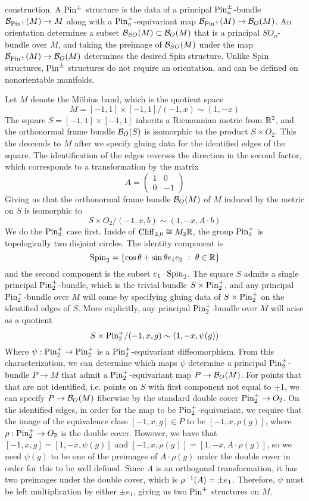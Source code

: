 construction. A $\mathrm{Pin}^\pm$ structure is the data of a principal
$\mathrm{Pin}^\pm_n$-bundle $\mathcal{B}_{\mathrm{Pin}^\pm}(M) \to M$ along with a
$\mathrm{Pin}^\pm_n$-equivariant map $\mathcal{B}_{\mathrm{Pin}^\pm}(M) \to \mathcal{B}_O(M)$. An orientation
determines a subset $\mathcal{B}_{SO}(M) \subset \mathcal{B}_O(M)$ that is a principal
$SO_n$-bundle over $M$, and taking the preimage of $\mathcal{B}_{SO}(M)$ under the
map $\mathcal{B}_{\mathrm{Pin}^\pm}(M) \to \mathcal{B}_O(M)$ determines the desired Spin structure.
%
Unlike Spin structures, $\mathrm{Pin}^\pm$ structures do not require an orientation,
and can be defined on nonorientable manifolds.
%
\begin{exmp}
Let $M$ denote the M\"obius band, which is the quotient space
\[
M = [-1,1] \times [-1,1] / (-1, x) \sim (1, -x)
\]
The square $S = [-1,1] \times [-1,1]$ inherits a Riemannian metric from $\mathbb{R}^2$,
and the orthonormal frame bundle $\mathcal{B}_O(S)$ is isomorphic to
the product $S \times O_2$. This the descends to $M$ after
we specify gluing data for the identified edges of the square. The identification
of the edges reverses the direction in the second factor, which corresponds to
a transformation by the matrix
\[
A = \begin{pmatrix}
1 & 0 \\
0 & -1
\end{pmatrix}
\]
Giving us that the orthonormal frame bundle $\mathcal{B}_O(M)$ of $M$ induced by the
metric on $S$ is isomorphic to
\[
S\times O_2 / (-1,x, b) \sim (1,-x, A \cdot b)
\]
We do the $\mathrm{Pin}^+_2$ case first. Inside of $\operatorname{Cliff}_{2,0} \cong M_2\mathbb{R}$,
the group $\mathrm{Pin}_2^+$ is topologically two disjoint circles. The identity component
is \[
\mathrm{Spin}_2 = \left\lbrace \cos\theta + \sin\theta e_1e_2 ~:~ \theta \in \mathbb{R} \right\rbrace
\]
and the second component is the subset $e_1 \cdot \mathrm{Spin}_2$. The square
$S$ admits a single principal $\mathrm{Pin}_2^+$-bundle, which is the trivial bundle
$S \times \mathrm{Pin}_2^+$, and any principal $\mathrm{Pin}_2^+$-bundle over $M$ will come
by specifying gluing data of $S \times \mathrm{Pin}_2^+$ on the identified edges of $S$.
More explicitly, any principal $\mathrm{Pin}_2^+$-bundle over $M$ will arise as a
quotient
\[
S \times \mathrm{Pin}_2^+ / (-1,x,g) \sim (1, -x, \psi(g))
\]
Where $\psi : \mathrm{Pin}_2^+ \to \mathrm{Pin}_2^+$ is a $\mathrm{Pin}_2^+$-equivariant diffeomorphism.
From this characterization, we can determine which maps $\psi$ determine
a principal $\mathrm{Pin}^+_2$-bundle $P \to M$ that admit a $\mathrm{Pin}_2^+$-equivariant
map $P \to \mathcal{B}_O(M)$. For points that that are not identified, i.e. points
on $S$ with first component not equal to $\pm 1$, we can specify
$P \to \mathcal{B}_O(M)$ fiberwise by the standard double cover $\mathrm{Pin}_2^+ \to O_2$. On
the identified edges, in order for the map to be $\mathrm{Pin}_2^+$-equivariant, we
require that the image of the equivalence class $[-1,x,g] \in P$ to be
$[-1, x, \rho(g)]$, where $\rho : \mathrm{Pin}_2^+ \to O_2$ is the double cover. However,
we have that $[-1,x,g] = [1, -x, \psi(g)]$ and
$[-1,x,\rho(g)] = [1,-x, A \cdot \rho(g)]$, so we need $\psi(g)$ to be one
of the preimages of $A \cdot \rho(g)$ under the double cover in order for this
to be well defined. Since $A$ is an orthogonal transformation, it has two
preimages under the double cover, which is $\rho^{-1}(A) = \pm e_1$. Therefore,
$\psi$ must be left multiplication by either $\pm e_1$, giving us two
$\mathrm{Pin}^+$ structures on $M$. \\


\end{exmp}
